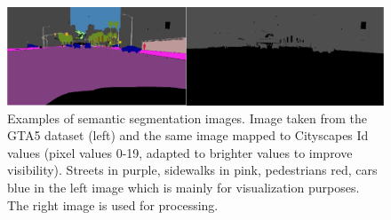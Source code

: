 \begin{figure}
	\centering
	\includegraphics[width=\textwidth]{../images/semseg.png}
	\caption{Examples of semantic segmentation images. Image taken from the GTA5 dataset \cite{Richter_2016_ECCV} (left) and the same image mapped to Cityscapes Id values (pixel values 0-19, adapted to brighter values to improve visibility). Streets in purple, sidewalks in pink, pedestrians red, cars blue in the left image which is mainly for visualization purposes. The right image is used for processing.}
	\label{fig:semseg}
\end{figure}



